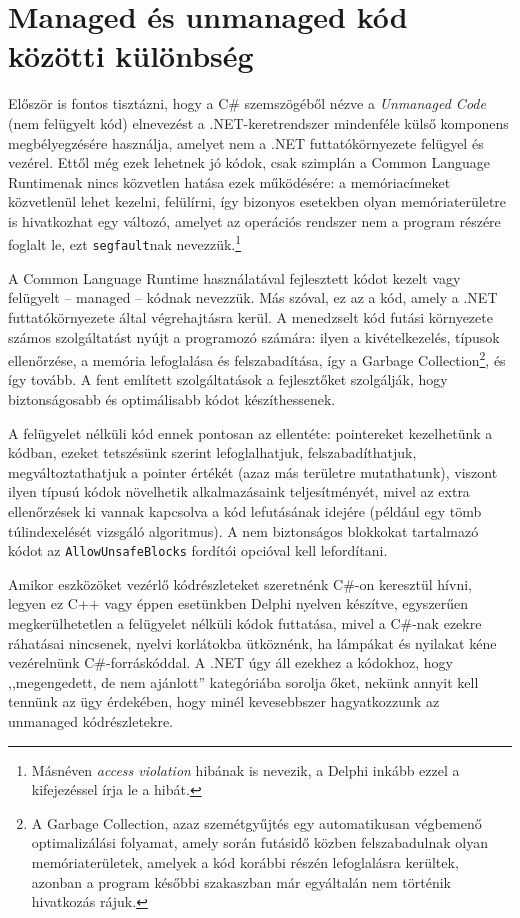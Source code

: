 \documentclass[tocnopagenum]{thesis-ekf}
\begin{document}
	\section{Managed és unmanaged kód közötti különbség}
	\label{managed_unmanaged}
	Először is fontos tisztázni, hogy a C\# szemszögéből nézve a \textit{Unmanaged Code} (nem felügyelt kód) elnevezést a .NET-keretrendszer mindenféle külső komponens megbélyegzésére használja, amelyet nem a .NET futtatókörnyezete felügyel és vezérel. Ettől még ezek lehetnek jó kódok, csak szimplán a Common Language Runtimenak nincs közvetlen hatása ezek működésére: a memóriacímeket közvetlenül lehet kezelni, felülírni, így bizonyos esetekben olyan memóriaterületre is hivatkozhat egy változó, amelyet az operációs rendszer nem a program részére foglalt le, ezt \verb*|segfault|nak nevezzük.\footnote{Másnéven \textit{access violation} hibának is nevezik, a Delphi inkább ezzel a kifejezéssel írja le a hibát.} \cite{managed} 
	
	A Common Language Runtime használatával fejlesztett kódot kezelt vagy felügyelt -- managed -- kódnak nevezzük. Más szóval, ez az a kód, amely a .NET futtatókörnyezete által végrehajtásra kerül. 
	A menedzselt kód futási környezete számos szolgáltatást nyújt a programozó számára: ilyen a kivételkezelés, típusok ellenőrzése, a memória lefoglalása és felszabadítása, így a Garbage Collection\footnote{A Garbage Collection, azaz szemétgyűjtés egy automatikusan végbemenő optimalizálási folyamat, amely során futásidő közben felszabadulnak olyan memóriaterületek, amelyek a kód korábbi részén lefoglalásra kerültek, azonban a program későbbi szakaszban már egyáltalán nem történik hivatkozás rájuk.}, és így tovább. A fent említett szolgáltatások a fejlesztőket szolgálják, hogy biztonságosabb és optimálisabb kódot készíthessenek.
	\cite{marshalling_serialization}
	
	A felügyelet nélküli kód ennek pontosan az ellentéte: pointereket kezelhetünk a kódban, ezeket tetszésünk szerint lefoglalhatjuk, felszabadíthatjuk, megváltoztathatjuk a pointer értékét (azaz más területre mutathatunk), viszont ilyen típusú kódok növelhetik alkalmazásaink teljesítményét, mivel az extra ellenőrzések ki vannak kapcsolva a kód lefutásának idejére (például egy tömb túlindexelését vizsgáló algoritmus).
	A nem biztonságos blokkokat tartalmazó kódot az \verb*|AllowUnsafeBlocks| fordítói opcióval kell lefordítani.
	
	Amikor eszközöket vezérlő kódrészleteket szeretnénk C\#-on keresztül hívni, legyen ez C++ vagy éppen esetünkben Delphi nyelven készítve, egyszerűen megkerülhetetlen a felügyelet nélküli kódok futtatása, mivel a C\#-nak ezekre ráhatásai nincsenek, nyelvi korlátokba ütköznénk, ha lámpákat és nyilakat kéne vezérelnünk C\#-forráskóddal. A .NET úgy áll ezekhez a kódokhoz, hogy ,,megengedett, de nem ajánlott'' kategóriába sorolja őket, nekünk annyit kell tennünk az ügy érdekében, hogy minél kevesebbszer hagyatkozzunk az unmanaged kódrészletekre.
	\cite{sof_managed}
\end{document}
